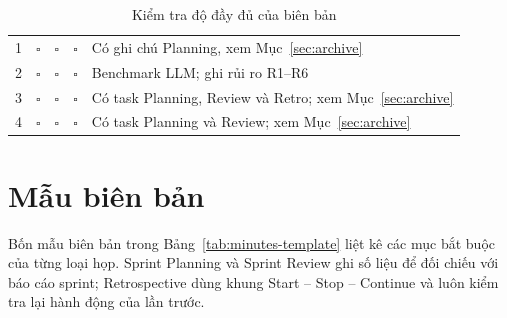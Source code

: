\documentclass[12pt,a4paper]{report}
\begin{document}
\begin{table}[htbp]
  \centering
  \caption{Kiểm tra độ đầy đủ của biên bản}
  \label{tab:minutes-check}
  \begin{tabularx}{\linewidth}{@{}Q{1.4cm}Q{2.2cm}Q{2.2cm}Q{2.8cm}L@{}}
    \toprule
     &  &  &  &  \\
     & $\square$ & $\square$ & $\square$ & Có ghi chú Planning, xem Mục~\ref{sec:archive} \\
    2 & $\square$ & $\square$ & $\square$ & Benchmark LLM; ghi rủi ro R1--R6 \\
    3 & $\square$ & $\square$ & $\square$ & Có task Planning, Review và Retro; xem Mục~\ref{sec:archive} \\
    4 & $\square$ & $\square$ & $\square$ & Có task Planning và Review; xem Mục~\ref{sec:archive} \\
    \bottomrule
  \end{tabularx}
\end{table}

\section{Mẫu biên bản}

Bốn mẫu biên bản trong Bảng~\ref{tab:minutes-template} liệt kê các mục bắt buộc của từng loại họp. Sprint Planning
và Sprint Review ghi số liệu để đối chiếu với báo cáo sprint; Retrospective dùng khung Start -- Stop -- Continue và
luôn kiểm tra lại hành động của lần trước.
\end{document}

